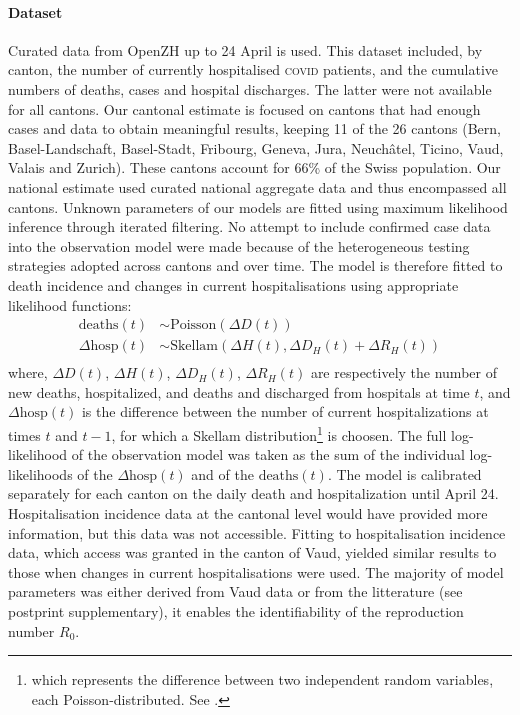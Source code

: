 \paragraph{Dataset} Curated data from OpenZH\cite[3\baselineskip]{openZH:OpenZHCovid19:2020} up to 24 April is used. This dataset included, by canton, the number of currently hospitalised \textsc{covid} patients, and the cumulative numbers of deaths, cases and hospital discharges. The latter were not available for all cantons. Our cantonal estimate is focused on cantons that had enough cases and data to obtain meaningful results, keeping 11 of the 26 cantons (Bern, Basel-Landschaft, Basel-Stadt, Fribourg, Geneva, Jura, Neuchâtel, Ticino, Vaud, Valais and Zurich). These cantons account for 66\% of the Swiss population. Our national estimate used curated national aggregate data and thus encompassed all cantons\cite{Probst:DaenuprobstCovid19casesswitzerland:2020}. Unknown parameters of our models are fitted using maximum likelihood inference through iterated filtering\cite{Ionides:InferenceDynamicLatent:2015}. No attempt to include confirmed case data into the observation model were made because of the heterogeneous testing strategies adopted across cantons and over time. The model is therefore fitted to death incidence and changes in current hospitalisations using appropriate likelihood functions:
\begin{equation}
\begin{split}
 \text{deaths}(t) &\sim \text{Poisson}(\Delta D(t)) \\
\Delta  \text{hosp}(t) &\sim \text{Skellam}(\Delta H(t), \Delta D_H(t) + \Delta R_H(t)) \\
\end{split}
\end{equation}
\noindent where, $\Delta D(t)$, $\Delta H(t)$, $\Delta D_H(t)$, $\Delta R_H(t)$ are respectively the number of new deaths, hospitalized, and deaths and discharged from hospitals at time $t$, and $\Delta \text{hosp}(t)$ is the difference between the number of current hospitalizations at times $t$ and $t-1$, for which a Skellam distribution\footnote{which represents the difference between two independent random variables, each Poisson-distributed. See .} is choosen. The full log-likelihood of the observation model was taken as the sum of the individual log-likelihoods of the $\Delta \text{hosp}(t)$ and of the $\text{deaths}(t)$. 
The model is calibrated separately for each canton on the daily death and hospitalization until April 24. Hospitalisation incidence data at the cantonal level would have provided more information, but this data was not accessible. Fitting to hospitalisation incidence data, which access was granted in the canton of Vaud, yielded similar results to those when changes in current hospitalisations were used. The majority of model parameters was either derived from Vaud data or from the litterature (see postprint supplementary), it enables the identifiability of the reproduction number $R_0$.
 

